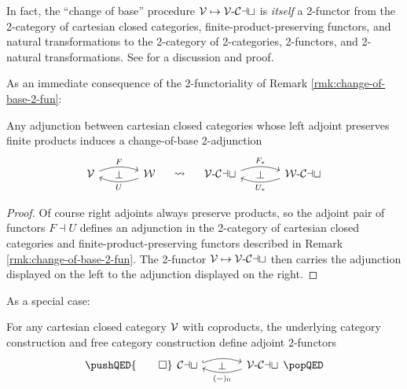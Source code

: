 \begin{rmk}\label{rmk:change-of-base-2-fun} In fact, the ``change of base'' procedure ${\mathord{\mathcal{V}}} \mapsto {{\mathord{\mathcal{V}}}}\text{-}{\mathord{\mathcal{Cat}}}$ is \emph{itself} a 2-functor from the 2-category of cartesian closed categories, finite-product-preserving functors, and natural transformations to the 2-category of 2-cat\-e\-go\-ries, 2-functors, and 2-natural transformations. See \cite[\S 4.3]{Cruttwell:2008rr} for a discussion and proof.
\end{rmk}


As an immediate consequence of the 2-functoriality of Remark \ref{rmk:change-of-base-2-fun}:

\begin{prop}\label{prop:change-of-base-adjunction} Any adjunction between cartesian closed categories whose left adjoint preserves finite products induces a change-of-base 2-adjunction
\[
\begin{tikzcd}[column sep=large]
\cV \arrow[r, bend left=20, "F"] \arrow[r, phantom, "\bot"] & \cW \arrow[l, bend left=20, "U"] \arrow[r, phantom, "\rightsquigarrow"] & \eCat{\cV} \arrow[r, bend left=20, start anchor=10, end anchor=170,  "F_*"] \arrow[r, phantom, "\bot"] & \eCat{\cW} \arrow[l, bend left=20, start anchor=190, end anchor=-10,  "U_*"]
\end{tikzcd}
\]
\end{prop}
\begin{proof}
Of course right adjoints always preserve products, so the adjoint pair of functors $F \dashv U$ defines an adjunction in the 2-category of cartesian closed categories and finite-product-preserving functors described in Remark \ref{rmk:change-of-base-2-fun}. The 2-functor ${\mathord{\mathcal{V}}} \mapsto {{\mathord{\mathcal{V}}}}\text{-}{\mathord{\mathcal{Cat}}}$ then carries the adjunction displayed on the left to the adjunction displayed on the right.
\end{proof}

As a special case:

\begin{cor}\label{cor:free-underlying-2-adj} For any cartesian closed category ${\mathord{\mathcal{V}}}$ with coproducts, the underlying category construction and free category construction define  adjoint 2-functors
\[
\pushQED{\qed}
\begin{tikzcd}[column sep=large]
\Cat \arrow[r, bend left=20, hook, start anchor=10, end anchor=170] \arrow[r, phantom, "\bot"] & \eCat{\cV} \arrow[l, bend left=20, start anchor=190, end anchor=-10, "(-)_0"]
\end{tikzcd} \qedhere
\popQED
\]
\end{cor}


